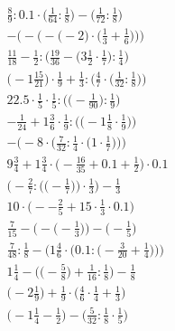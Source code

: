 \documentclass[8pt]{article}
\begin{document}
\begin{align}
\frac{8}{9} : 0.1 \cdot \big(\frac{1}{64} : \frac{1}{8}\big) - \big(\frac{1}{72} : \frac{1}{8}\big) \\
-\bigg(-\Big(-\big(-2\big) \cdot \big(\frac{1}{3} + \frac{1}{6}\big)\Big)\bigg) \\
\frac{11}{18} - \frac{1}{2} : \Big(\frac{19}{36} - \big(3\frac{1}{2} \cdot \frac{1}{7}\big) : \frac{1}{4}\Big) \\
\Big(-1\frac{15}{21}\Big) \cdot \frac{1}{9} + \frac{1}{3} : \Big(\frac{4}{7} \cdot \big(\frac{1}{32} : \frac{1}{8}\big)\Big) \\
22.5 \cdot \frac{1}{5} \cdot \frac{1}{5} : \Big(\big(-\frac{1}{90}\big) : \frac{1}{9}\Big) \\
-\frac{1}{24} + 1\frac{3}{6} \cdot \frac{1}{9} : \Big(\big(-1\frac{1}{8} \cdot \frac{1}{9}\big)\Big) \\
-\bigg(-8 \cdot \Big(\frac{7}{32} : \frac{1}{4} \cdot \big(1 \cdot \frac{1}{7}\big)\Big)\bigg) \\
9\frac{3}{4} + 1\frac{3}{4} \cdot \big(-\frac{16}{35} + 0.1 + \frac{1}{2}\big) \cdot 0.1 \\
\bigg(-\frac{2}{7} : \Big(\big(-\frac{1}{7}\big)\Big) \cdot \frac{1}{3}\bigg) - \frac{1}{3} \\
10 \cdot \big(--\frac{2}{5} + 15 \cdot \frac{1}{3} \cdot 0.1\big) \\
\frac{7}{15} - \Big(-\big(-\frac{1}{3}\big)\Big) - \Big(-\frac{1}{5}\Big) \\
\frac{7}{48} : \frac{1}{8} - \bigg(1\frac{4}{6} \cdot \Big(0.1 : \big(-\frac{3}{20} + \frac{1}{4}\big)\Big)\bigg) \\
1\frac{1}{4} - \Big(\big(-\frac{5}{8}\big) + \frac{1}{16} : \frac{1}{8}\Big) - \frac{1}{8} \\
\big(-2\frac{1}{9}\big) + \frac{1}{9} \cdot \big(\frac{4}{6} \cdot \frac{1}{4} + \frac{1}{3}\big) \\
\big(-1\frac{1}{4} - \frac{1}{2}\big) - \big(\frac{5}{32} : \frac{1}{8} \cdot \frac{1}{5}\big)
\end{align}
\end{document}
